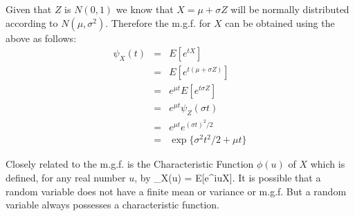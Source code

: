 Given that $Z$ is $N(0,1)$ we know that $X = \mu + \sigma Z$ will be normally distributed according to $N(\mu, \sigma^2)$. Therefore the m.g.f. for $X$ can be obtained using the above as follows:
\begin{eqnarray*}
\psi_X(t) &=& E[e^{tX}]\\
               &=& E[e^{t(\mu + \sigma Z)}]\\
               &=& e^{\mu t}E[e^{t \sigma Z}]\\
               &=& e^{\mu t}\psi_Z(\sigma t)\\
               &=& e^{\mu t}e^{(\sigma t)^2/2}\\
               &=& \exp\big\{\sigma^2 t^2/2 + \mu t\big\}
\end{eqnarray*}

Closely related to the m.g.f. is the Characteristic Function $\phi(u)$ of $X$ which is defined, for any real number $u$, by
\be \phi_X(u) = E[e^{iuX}]. \ee
It is possible that a random variable does not have a finite mean or variance or m.g.f. But a random variable always possesses a characteristic function.\\

